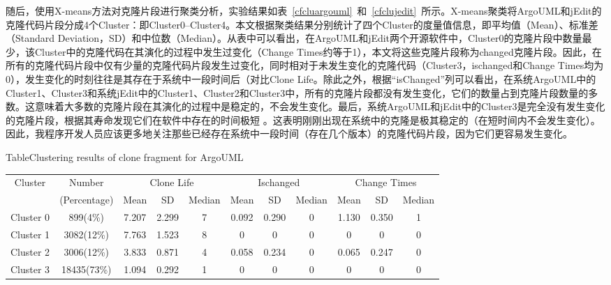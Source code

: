 随后，使用X-means方法对克隆片段进行聚类分析，实验结果如表~\ref{cfcluargouml}~和~\ref{cfclujedit}~所示。X-means聚类将{ArgoUML}和{jEdit}的克隆代码片段分成4个Cluster：即Cluster0--Cluster4。本文根据聚类结果分别统计了四个Cluster的度量值信息，即平均值（Mean）、标准差（Standard Deviation，SD）和中位数（Median）。从表中可以看出，在{ArgoUML}和{jEdit}两个开源软件中，Cluster0的克隆片段中数量最少，该Cluster中的克隆代码在其演化的过程中发生过变化（Change Times约等于1），本文将这些克隆片段称为{changed}克隆片段。因此，{在所有的克隆代码片段中仅有少量的克隆代码片段发生过变化，同时相对于未发生变化的克隆代码（Cluster3，ischanged和Change Times均为0），发生变化的时刻往往是其存在于系统中一段时间后（对比Clone Life}。除此之外，根据``{isChanged}''列可以看出，在系统{ArgoUML}中的Cluster1、Cluster3和系统{jEdit}中的Cluster1、Cluster2和Cluster3中，所有的克隆片段都没有发生变化，它们的数量占到克隆片段数量的多数。这意味着{大多数的克隆片段在其演化的过程中是稳定的，不会发生变化}。最后，系统{ArgoUML}和{jEdit}中的Cluster3是完全没有发生变化的克隆片段，根据其寿命发现它们在软件中存在的时间极短 。这表明{刚刚出现在系统中的克隆是极其稳定的（在短时间内不会发生变化）}。因此，我程序开发人员应该更多地关注{那些已经存在系统中一段时间（存在几个版本）的克隆代码片段，因为它们更容易发生变化。}


\begin{table}[htbp]
{Table$\!$}{Clustering results of clone fragment for ArgoUML}
\vspace{0.5em}
\centering
\footnotesize
\begin{tabular}{ccccccccccc}
\toprule[1.5pt]
\multirow{2}{*}{Cluster}&{Number}&\multicolumn{3}{c}{Clone Life}&\multicolumn{3}{c}{Ischanged}&\multicolumn{3}{c}{Change Times} \\
&(Percentage)&{Mean}&SD &{Median}&{Mean}&SD &{Median}&{Mean}&SD &{Median}\\
\midrule[1pt]
Cluster 0&899(4\%)&7.207&2.299&7&0.092&0.290&0&1.130&0.350&1\\ 
Cluster 1&3082(12\%)&7.763&1.523&8&0&0&0	&0&0&0\\ 
Cluster 2&3006(12\%)&3.833&0.871&4&0.058&0.234&0	&0.065&0.247&0\\ 
Cluster 3&18435(73\%)&1.094&0.292&1	&0	&0	&0	&0	&0	&0\\ 
\bottomrule[1.5pt]
\end{tabular}
\end{table}

